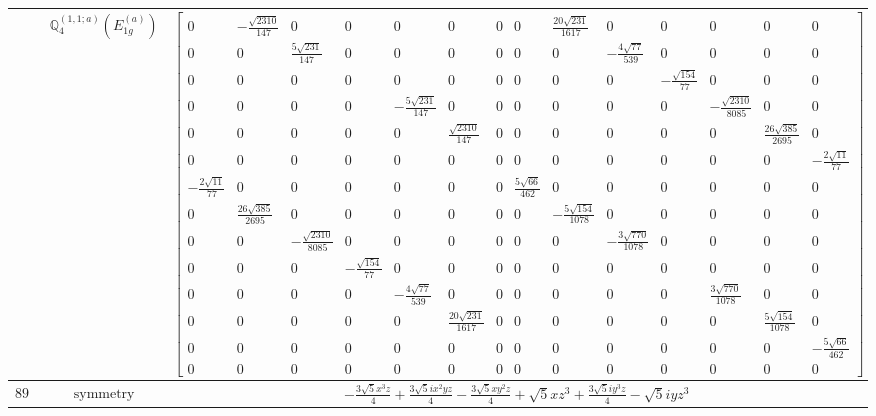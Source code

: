 \documentclass[fleqn,8pt,landscape]{jsarticle}
\begin{document}
\begin{longtable}{ccc}
$  $ & $ \mathbb{Q}_{4}^{(1,1;a)}(E_{1g}^{(a)}) $ & $ \begin{bmatrix} 0 & - \frac{\sqrt{2310}}{147} & 0 & 0 & 0 & 0 & 0 & 0 & \frac{20 \sqrt{231}}{1617} & 0 & 0 & 0 & 0 & 0 \\ 0 & 0 & \frac{5 \sqrt{231}}{147} & 0 & 0 & 0 & 0 & 0 & 0 & - \frac{4 \sqrt{77}}{539} & 0 & 0 & 0 & 0 \\ 0 & 0 & 0 & 0 & 0 & 0 & 0 & 0 & 0 & 0 & - \frac{\sqrt{154}}{77} & 0 & 0 & 0 \\ 0 & 0 & 0 & 0 & - \frac{5 \sqrt{231}}{147} & 0 & 0 & 0 & 0 & 0 & 0 & - \frac{\sqrt{2310}}{8085} & 0 & 0 \\ 0 & 0 & 0 & 0 & 0 & \frac{\sqrt{2310}}{147} & 0 & 0 & 0 & 0 & 0 & 0 & \frac{26 \sqrt{385}}{2695} & 0 \\ 0 & 0 & 0 & 0 & 0 & 0 & 0 & 0 & 0 & 0 & 0 & 0 & 0 & - \frac{2 \sqrt{11}}{77} \\ - \frac{2 \sqrt{11}}{77} & 0 & 0 & 0 & 0 & 0 & 0 & \frac{5 \sqrt{66}}{462} & 0 & 0 & 0 & 0 & 0 & 0 \\ 0 & \frac{26 \sqrt{385}}{2695} & 0 & 0 & 0 & 0 & 0 & 0 & - \frac{5 \sqrt{154}}{1078} & 0 & 0 & 0 & 0 & 0 \\ 0 & 0 & - \frac{\sqrt{2310}}{8085} & 0 & 0 & 0 & 0 & 0 & 0 & - \frac{3 \sqrt{770}}{1078} & 0 & 0 & 0 & 0 \\ 0 & 0 & 0 & - \frac{\sqrt{154}}{77} & 0 & 0 & 0 & 0 & 0 & 0 & 0 & 0 & 0 & 0 \\ 0 & 0 & 0 & 0 & - \frac{4 \sqrt{77}}{539} & 0 & 0 & 0 & 0 & 0 & 0 & \frac{3 \sqrt{770}}{1078} & 0 & 0 \\ 0 & 0 & 0 & 0 & 0 & \frac{20 \sqrt{231}}{1617} & 0 & 0 & 0 & 0 & 0 & 0 & \frac{5 \sqrt{154}}{1078} & 0 \\ 0 & 0 & 0 & 0 & 0 & 0 & 0 & 0 & 0 & 0 & 0 & 0 & 0 & - \frac{5 \sqrt{66}}{462} \\ 0 & 0 & 0 & 0 & 0 & 0 & 0 & 0 & 0 & 0 & 0 & 0 & 0 & 0 \end{bmatrix} $ \\ \hline
$ 894 $ & $ \text{symmetry} $ & $ - \frac{3 \sqrt{5} x^{3} z}{4} + \frac{3 \sqrt{5} i x^{2} y z}{4} - \frac{3 \sqrt{5} x y^{2} z}{4} + \sqrt{5} x z^{3} + \frac{3 \sqrt{5} i y^{3} z}{4} - \sqrt{5} i y z^{3} $ \\

\end{longtable}
\end{document}
